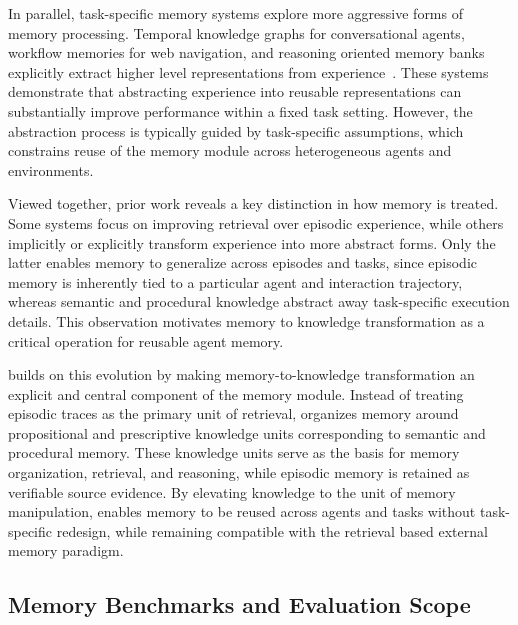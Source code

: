 In parallel, task-specific memory systems explore more aggressive forms of memory processing. Temporal knowledge graphs for conversational agents, workflow memories for web navigation, and reasoning oriented memory banks explicitly extract higher level representations from experience~\citep{gutiérrez2025ragmemorynonparametriccontinual,wang2024agentworkflowmemory,ouyang2025reasoningbankscalingagentselfevolving}. These systems demonstrate that abstracting experience into reusable representations can substantially improve performance within a fixed task setting. However, the abstraction process is typically guided by task-specific assumptions, which constrains reuse of the memory module across heterogeneous agents and environments.

Viewed together, prior work reveals a key distinction in how memory is treated. Some systems focus on improving retrieval over episodic experience, while others implicitly or explicitly transform experience into more abstract forms. Only the latter enables memory to generalize across episodes and tasks, since episodic memory is inherently tied to a particular agent and interaction trajectory, whereas semantic and procedural knowledge abstract away task-specific execution details. This observation motivates memory to knowledge transformation as a critical operation for reusable agent memory.

\plugmem builds on this evolution by making memory-to-knowledge transformation an explicit and central component of the memory module. Instead of treating episodic traces as the primary unit of retrieval, \plugmem organizes memory around propositional and prescriptive knowledge units corresponding to semantic and procedural memory. These knowledge units serve as the basis for memory organization, retrieval, and reasoning, while episodic memory is retained as verifiable source evidence. By elevating knowledge to the unit of memory manipulation, \plugmem enables memory to be reused across agents and tasks without task-specific redesign, while remaining compatible with the retrieval based external memory paradigm.


\subsection{Memory Benchmarks and Evaluation Scope}

